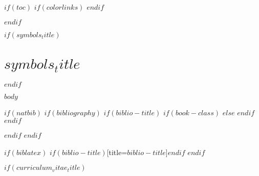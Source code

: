 \documentclass[$if(fontsize)$$fontsize$,$endif$$if(lang)$$babel-lang$,$endif$$if(papersize)$$papersize$paper,$endif$$for(classoption)$$classoption$$sep$,$endfor$]{$documentclass$}
\renewcommand{\chaptername}{}
\renewcommand{\thechapter}{Chapter \arabic{chapter}}
\begin{document}
$if(toc)$
\begingroup
    \renewcommand{\contentsname}{\center Table of Content \addcontentsline{toc}{chapter}{Table of Content}}
    \renewcommand{\numberline}[1]{~#1\hspace*{1em}}
    $if(colorlinks)$
    \hypersetup{linkcolor=$if(toccolor)$$toccolor$$else$black$endif$}
    $endif$
    \setcounter{tocdepth}{$toc-depth$}
    \tableofcontents
    \newcommand{\lotlabel}{Table}
    \renewcommand{\listtablename}{\center Tables \addcontentsline{toc}{chapter}{List of Tables}}
    \renewcommand{\numberline}[1]{\lotlabel~#1\hspace*{1em}}
    \listoftables
    \newcommand{\loflabel}{Figure}
    \renewcommand{\listfigurename}{\center Figures \addcontentsline{toc}{chapter}{List of Figures}}
    \renewcommand{\numberline}[1]{\loflabel~#1\hspace*{1em}}
    \listoffigures
\endgroup
$endif$

$if(symbols_title)$
\chapter*{$symbols_title$}
\fontsize{14}{21}\selectfont{$symbols$}
$endif$

\mainmatter
$body$

$if(natbib)$
$if(bibliography)$
    \renewcommand{\chaptername}{}
    \renewcommand{\thechapter}{}
    $if(biblio-title)$
        $if(book-class)$
        \renewcommand\bibname{$biblio-title$}
        $else$
        \renewcommand\refname{$biblio-title$}
        $endif$
    $endif$
    
$endif$
$endif$

$if(biblatex)$
\printbibliography$if(biblio-title)$[title=$biblio-title$]$endif$
$endif$

$if(curriculum_vitae_title)$
\end{document}
